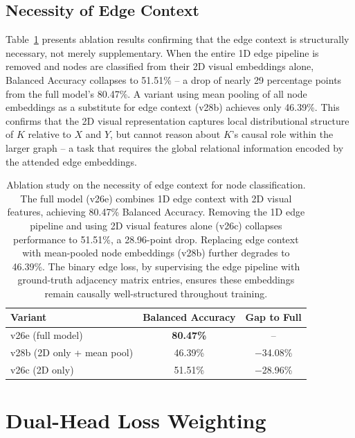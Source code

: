 \subsection{Necessity of Edge Context}

Table~\ref{tab:edge_context_necessity} presents ablation results confirming that the edge context is structurally necessary, not merely supplementary. When the entire 1D edge pipeline is removed and nodes are classified from their 2D visual embeddings alone, Balanced Accuracy collapses to 51.51\% -- a drop of nearly 29 percentage points from the full model's 80.47\%. A variant using mean pooling of all node embeddings as a substitute for edge context (v28b) achieves only 46.39\%. This confirms that the 2D visual representation captures local distributional structure of $K$ relative to $X$ and $Y$, but cannot reason about $K$'s causal role within the larger graph -- a task that requires the global relational information encoded by the attended edge embeddings.

\begin{table}[ht]
	\centering
	\caption{Ablation study on the necessity of edge context for node classification. The full model (v26e) combines 1D edge context with 2D visual features, achieving 80.47\% Balanced Accuracy. Removing the 1D edge pipeline and using 2D visual features alone (v26c) collapses performance to 51.51\%, a 28.96-point drop. Replacing edge context with mean-pooled node embeddings (v28b) further degrades to 46.39\%. The binary edge loss, by supervising the edge pipeline with ground-truth adjacency matrix entries, ensures these embeddings remain causally well-structured throughout training.}
	\label{tab:edge_context_necessity}
	\begin{tabular}{lcc}
		\toprule
		\textbf{Variant}           & \textbf{Balanced Accuracy} & \textbf{Gap to Full} \\
		\midrule
		v26e (full model)         & \textbf{80.47\%}           & --                   \\
		v28b (2D only + mean pool) & 46.39\%                     & $-$34.08\%           \\
		v26c (2D only)             & 51.51\%                     & $-$28.96\%           \\
		\bottomrule
	\end{tabular}
\end{table}

\section{Dual-Head Loss Weighting}
\label{sec:loss}

